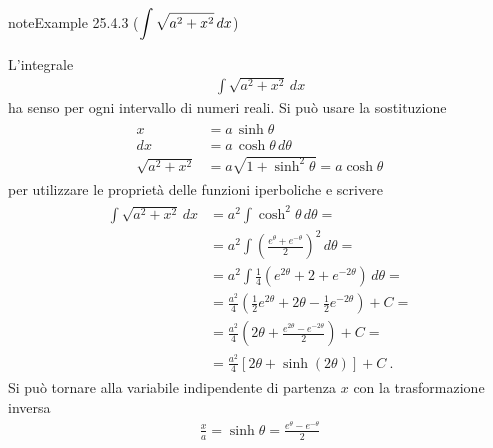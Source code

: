 \documentclass[letterpaper,10pt,italian]{jupyterBook}
\begin{document}
\begin{sphinxadmonition}{note}{Example 25.4.3 (\protect\( \displaystyle \int \sqrt{a^2 + x^2} \,  dx\protect\))}



\sphinxAtStartPar
L’integrale
\begin{equation*}
\begin{split}\int \sqrt{a^2 + x^2} \,  dx\end{split}
\end{equation*}
\sphinxAtStartPar
ha senso per ogni intervallo di numeri reali. Si può usare la sostituzione
\begin{equation*}
\begin{split}\begin{aligned}
   x & = a \, \sinh \theta \\
  dx & = a \, \cosh \theta \, d \theta \\
  \sqrt{a^2 + x^2} & = a \sqrt{1 + \sinh^2 \theta} = a \cosh \theta
\end{aligned}\end{split}
\end{equation*}
\sphinxAtStartPar
per utilizzare le proprietà delle funzioni iperboliche e scrivere
\begin{equation*}
\begin{split}\begin{aligned}
  \int \sqrt{a^2 + x^2} \, dx
   & = a^2 \int \cosh^2 \theta \, d \theta = \\
   & = a^2 \int \left( \frac{e^\theta + e^{-\theta}}{2} \right)^2 \, d \theta = \\
   & = a^2 \int \frac{1}{4} \left( e^{2 \theta} + 2 + e^{-2 \theta} \right) \, d \theta = \\
   & = \frac{a^2}{4} \left( \frac{1}{2} e^{2 \theta} + 2 \theta - \frac{1}{2} e^{-2 \theta} \right) + C = \\
   & = \frac{a^2}{4} \left( 2 \theta + \frac{e^{2 \theta} - e^{-2 \theta}}{2} \right) + C = \\
   & = \frac{a^2}{4} \left[ 2 \theta + \sinh \left( 2 \theta \right) \right] + C \ .
\end{aligned}\end{split}
\end{equation*}
\sphinxAtStartPar
Si può tornare alla variabile indipendente di partenza \(x\) con la trasformazione inversa
\begin{equation*}
\begin{split}\frac{x}{a} = \sinh \theta = \frac{e^{\theta} - e^{-\theta}}{2}\end{split}

\end{equation*}
\end{sphinxadmonition}
\end{document}
